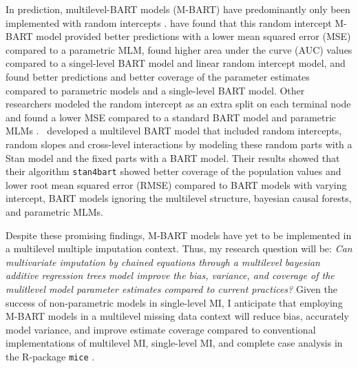 \documentclass[10pt, a4paper, titlepage]{article}
\begin{document}
In prediction, multilevel-BART models (M-BART) have predominantly only been implemented with random intercepts \citep{chen2020, wagner2020, tan2016, wundervald2022}. \citet{wagner2020} have found that this random intercept M-BART model provided better predictions with a lower mean squared error (MSE) compared to a parametric MLM, \citet{tan2016} found higher area under the curve (AUC) values compared to a singel-level BART model and linear random intercept model, and \citet{chen2020} found better predictions and better coverage of the parameter estimates compared to parametric models and a single-level BART model. Other researchers modeled the random intercept as an extra split on each terminal node and found a lower MSE compared to a standard BART model and parametric MLMs \citep{wundervald2022}.~\citet{dorie2022} developed a multilevel BART model that included random intercepts, random slopes and cross-level interactions by modeling these random parts with a Stan \citep{lee2017} model and the fixed parts with a BART model. Their results showed that their algorithm \texttt{stan4bart} showed better coverage of the population values and lower root mean squared error (RMSE) compared to BART models with varying intercept, BART models ignoring the multilevel structure, bayesian causal forests, and parametric MLMs. 



Despite these promising findings, M-BART models have yet to be implemented in a multilevel multiple imputation context. Thus, my research question will be: \textit{Can multivariate imputation by chained equations through a multilevel bayesian additive regression trees model improve the bias, variance, and coverage of the mulitlevel model parameter estimates compared to current practices?} Given the success of non-parametric models in single-level MI, I anticipate that employing M-BART models in a multilevel missing data context will reduce bias, accurately model variance, and improve estimate coverage compared to conventional implementations of multilevel MI, single-level MI, and complete case analysis in the R-package \texttt{mice} \citep{buuren2011}. 
\end{document}
